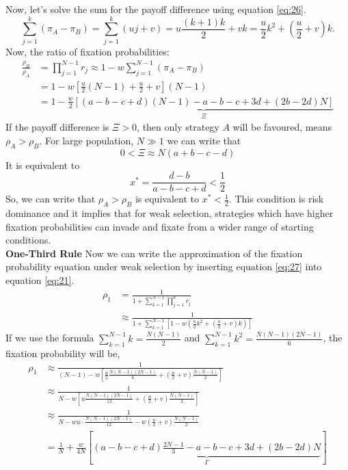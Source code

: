 \documentclass{article}
\begin{document}
Now, let's solve the sum for the payoff difference using equation \eqref{eq:26}.
\begin{equation}
\sum_{j=1}^{k} (\pi_A - \pi_B) = \sum_{j=1}^{k} (u j + v) = u \frac{(k+1)k}{2} + vk = \frac{u}{2}k^2 +( \frac{u}{2} + v)k. \label{eq:27}
\end{equation}
Now, the ratio of fixation probabilities:
\begin{align}
\frac{\rho_B}{\rho_A} &= \prod_{j=1}^{N-1}r_j \approx 1 - w \sum_{j=1}^{N-1} (\pi_A - \pi_B)\nonumber\\
&= 1 - w[ \frac{u}{2}(N-1) + \frac{u}{2} + v](N-1) \nonumber\\
&= 1 - \frac{w}{2} \underbrace{[(a - b - c + d)(N - 1) - a - b - c + 3d + (2b - 2d)N]}_{\Xi} \label{eq:28}
\end{align}
If the payoff difference is $\Xi > 0$, then only strategy $A$ will be favoured, means $\rho_A>\rho_B$.
For large population, $N \gg 1$ we can write that
\begin{equation}
0<\Xi \approx N(a+b-c-d)\label{eq:29}
\end{equation}
It is equivalent to
\begin{equation}
x^*=\frac{d-b}{a-b-c+d}<\frac{1}{2} \label{eq:30}
\end{equation}
So, we can write that $\rho_A >\rho_B$ is equivalent to $x^*<\frac{1}{2}$.
This condition is risk dominance and it implies that for weak selection, strategies which have higher fixation probabilities can invade and fixate from a wider range of starting conditions.\\
\textbf{One-Third Rule}
\newline
Now we can write the approximation of the fixation probability equation under weak selection by inserting equation \eqref{eq:27} into equation \eqref{eq:21}.
\begin{align}
\rho_1 &= \frac{1}{1+\sum_{k=1}^{N-1} \prod_{j=1}^{k}r_j}\nonumber\\
&\approx \frac{1}{1+\sum_{k=1}^{N-1}[1-w(\frac{u}{2}k^2+(\frac{u}{2}+v)k)]} \label{eq:31}
\end{align}
If we use the formula $\sum_{k=1}^{N-1} k = \frac{N(N - 1)}{2}$ and $\sum_{k=1}^{N-1} k^2 = \frac{N(N - 1)(2N - 1)}{6}$, the fixation probability will be,
\begin{align}
\rho_1 &\approx\frac{1}{(N - 1)- w [\frac{u}{2}\frac{N(N - 1)(2N - 1)}{6} + (\frac{u}{2} + v)\frac{N(N - 1)}{2}]}\nonumber\\
&\approx \frac{1}{N - w[ u \frac{N(N - 1)(2N - 1)}{12} + ( \frac{u}{2} + v)\frac{N(N - 1)}{2}]}\nonumber\\
&\approx \frac{1}{N - wu \cdot \frac{N(N - 1)(2N - 1)}{12} - w ( \frac{u}{2} + v)\frac{N(N - 1)}{2}} \nonumber\\
&= \frac{1}{N} + \frac{w}{4N}[\underbrace{( a - b - c + d)\frac{2N - 1}{3} - a - b - c + 3d + (2b - 2d)N
}_{\Gamma}] \label{eq:32}
\end{align}
\end{document}
